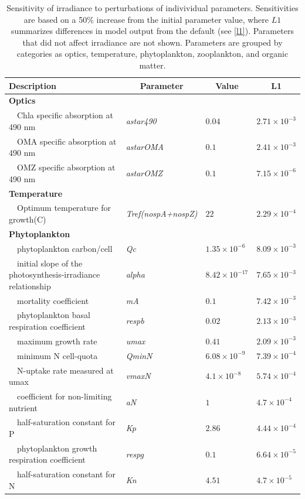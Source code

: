 \documentclass[letterpaper,12pt,oneside]{article}\usepackage[]{graphicx}\usepackage[]{color}
\begin{document}
\begin{table}[!tbp]
{\footnotesize
\caption{Sensitivity of irradiance to perturbations of indivividual parameters.  Sensitivities are based on a 50\% increase from the initial parameter value, where $L1$ summarizes differences in model output from the default (see \cref{l1}).  Parameters that did not affect irradiance are not shown.  Parameters are grouped by categories as optics, temperature, phytoplankton, zooplankton, and organic matter.\label{tab:irrsens}} 
\begin{center}
\begin{tabular}{llll}
\hline\hline
\multicolumn{1}{l}{Description}&\multicolumn{1}{c}{Parameter}&\multicolumn{1}{c}{Value}&\multicolumn{1}{c}{L1}\tabularnewline
\hline
{\bfseries Optics}&&&\tabularnewline
~~Chla specific absorption at 490 nm&\textit{astar490}&$0.04$&$2.71\times 10^{-3}$\tabularnewline
~~OMA specific absorption at 490 nm&\textit{astarOMA}&$0.1$&$2.41\times 10^{-3}$\tabularnewline
~~OMZ specific absorption at 490 nm&\textit{astarOMZ}&$0.1$&$7.15\times 10^{-6}$\tabularnewline
\hline
{\bfseries Temperature}&&&\tabularnewline
~~Optimum temperature for growth(C)&\textit{Tref(nospA+nospZ)}&$22$&$2.29\times 10^{-4}$\tabularnewline
\hline
{\bfseries Phytoplankton}&&&\tabularnewline
~~phytoplankton carbon/cell&\textit{Qc}&$1.35\times 10^{-6}$&$8.09\times 10^{-3}$\tabularnewline
~~initial slope of the photosynthesis-irradiance relationship&\textit{alpha}&$8.42\times 10^{-17}$&$7.65\times 10^{-3}$\tabularnewline
~~mortality coefficient&\textit{mA}&$0.1$&$7.42\times 10^{-3}$\tabularnewline
~~phytoplankton basal respiration coefficient&\textit{respb}&$0.02$&$2.13\times 10^{-3}$\tabularnewline
~~maximum growth rate&\textit{umax}&$0.41$&$2.09\times 10^{-3}$\tabularnewline
~~minimum N cell-quota&\textit{QminN}&$6.08\times 10^{-9}$&$7.39\times 10^{-4}$\tabularnewline
~~N-uptake rate measured at umax&\textit{vmaxN}&$4.1\times 10^{-8}$&$5.74\times 10^{-4}$\tabularnewline
~~coefficient for non-limiting nutrient&\textit{aN}&$1$&$4.7\times 10^{-4}$\tabularnewline
~~half-saturation constant for P&\textit{Kp}&$2.86$&$4.44\times 10^{-4}$\tabularnewline
~~phytoplankton growth respiration coefficient&\textit{respg}&$0.1$&$6.64\times 10^{-5}$\tabularnewline
~~half-saturation constant for N&\textit{Kn}&$4.51$&$4.7\times 10^{-5}$\tabularnewline

\end{tabular}
\end{center}}
\end{table}
\end{document}
